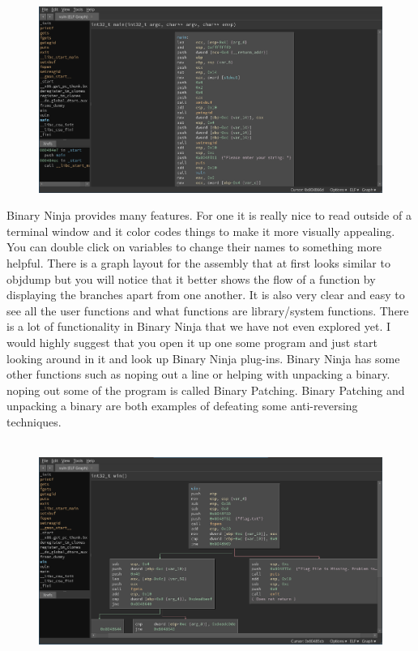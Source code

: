 \documentclass{report}
\begin{document}
\begin{figure}[t]
	\hbox{\hspace{-5em} \includegraphics[width=1.2\textwidth]{BNinja1.png}}
    \centering
\end{figure}
Binary Ninja provides many features.  For one it is really nice to read outside of a terminal
window and it color codes things to make it more visually appealing.  You can double click on
variables to change their names to something more helpful.  There is a graph layout for the
assembly that at first looks similar to objdump but you will notice that it better shows the
flow of a function by displaying the branches apart from one another.  It is also very clear
and easy to see all the user functions and what functions are library/system functions.  There
is a lot of functionality in Binary Ninja that we have not even explored yet.  I would highly
suggest that you open it up one some program and just start looking around in it and look up
Binary Ninja plug-ins.  Binary Ninja has some other functions such as noping out a line or 
helping with unpacking a binary.  noping out some of the program is called Binary Patching. 
Binary Patching and unpacking a binary are both examples of defeating some anti-reversing 
techniques.
\begin{figure}[b]
	\hbox{\hspace{-5em} \includegraphics[width=1.2\textwidth]{BNinja2.png}}
    \centering
\end{figure}
\end{document}
